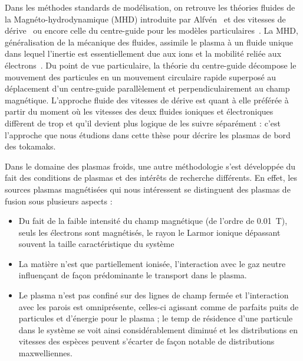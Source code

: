 \begin{refsection}
Dans les méthodes standards de modélisation, on retrouve les théories fluides de
la Magnéto-hydrodynamique
 (MHD) introduite
par Alfvén~\parencite{Alfven} et des vitesses de dérive~\parencite{SarazinPhD}
ou encore celle du centre-guide pour les modèles
particulaires~\parencite{Taylor,Lee,Garbet10}.
La MHD, généralisation de la mécanique des fluides, assimile le plasma à un fluide unique dans lequel
l'inertie est essentiellement due aux ions et la mobilité reliée aux
électrons~\parencite{Rax}. Du point de vue particulaire, la
théorie du centre-guide décompose le mouvement des particules en un mouvement
circulaire rapide superposé au déplacement d'un centre-guide parallèlement et
perpendiculairement au champ magnétique. L'approche fluide des vitesses de
dérive est quant à elle préférée à partir du moment où les vitesses des deux fluides
ioniques et électroniques diffèrent de trop et qu'il devient plus logique de les
suivre séparément : c'est l'approche que nous étudions dans cette thèse pour
décrire les plasmas de bord des tokamaks.

Dans le domaine des plasmas froids, une autre méthodologie s'est développée du
fait des conditions de plasmas et des intérêts de recherche
différents. En effet, les sources plasmas magnétisées qui nous intéressent
se distinguent des plasmas de fusion sous plusieurs aspects :

\begin{itemize}
  \item Du fait de la faible intensité du champ magnétique (de l'ordre de
  0.01~T), seuls les électrons sont magnétisés, le rayon le Larmor ionique dépassant souvent la
  taille caractéristique du système
  \item La matière n'est que partiellement ionisée, l'interaction avec
  le gaz neutre influençant de façon prédominante le transport dans le plasma.
  \item Le plasma n'est pas confiné sur des lignes de champ fermée et
  l'interaction avec les parois est omniprésente, celles-ci agissant comme de
  parfaits puits de particules et d'énergie pour le plasma ;
  le temp de résidence d'une particule dans le système se voit
  ainsi considérablement diminué et les distributions en vitesses des
  espèces peuvent s'écarter de façon notable de distributions maxwelliennes.
\end{itemize}


\end{refsection}
